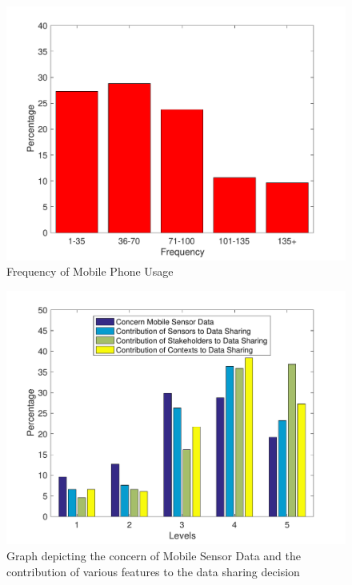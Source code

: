 \begin{figure}[ht!]
\centering
\includegraphics[width=\textwidth,keepaspectratio]{./images/pre_q7}
\caption{Frequency of Mobile Phone Usage}
\label{fig:pre_q7}
\end{figure}

\begin{figure}[ht!]
\centering
\includegraphics[width=\textwidth,keepaspectratio]{./images/pre_q8101214}
\caption{Graph depicting the concern of Mobile Sensor Data and the contribution of various features to the data sharing decision}
\label{fig:pre_q8}
\end{figure}

